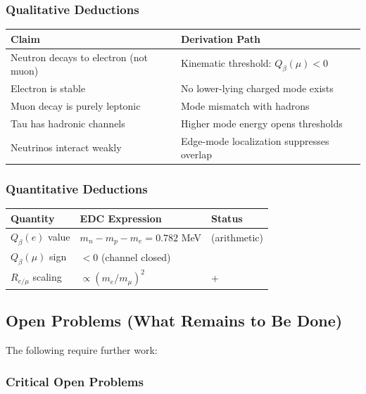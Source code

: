 \subsubsection{Qualitative Deductions}

\begin{center}
\begin{tabular}{p{5cm}p{8cm}}
\toprule
\textbf{Claim} & \textbf{Derivation Path} \\
\midrule
Neutron decays to electron (not muon) & Kinematic threshold: $Q_\beta(\mu) < 0$ \\
Electron is stable & No lower-lying charged mode exists \\
Muon decay is purely leptonic & Mode mismatch with hadrons \\
Tau has hadronic channels & Higher mode energy opens thresholds \\
Neutrinos interact weakly & Edge-mode localization suppresses overlap \\
\bottomrule
\end{tabular}
\end{center}

\subsubsection{Quantitative Deductions}

\begin{center}
\begin{tabular}{p{4cm}p{5cm}p{4cm}}
\toprule
\textbf{Quantity} & \textbf{EDC Expression} & \textbf{Status} \\
\midrule
$Q_\beta(e)$ value & $m_n - m_p - m_e = 0.782$ MeV & \tagDc{} (arithmetic) \\
$Q_\beta(\mu)$ sign & $< 0$ (channel closed) & \tagDc{} \\
$R_{e/\mu}$ scaling & $\propto (m_e/m_\mu)^2$ & \tagBL{} + \tagP{} \\
\bottomrule
\end{tabular}
\end{center}

\subsection{Open Problems (What Remains to Be Done)}

The following require further work:

\subsubsection{Critical Open Problems}

